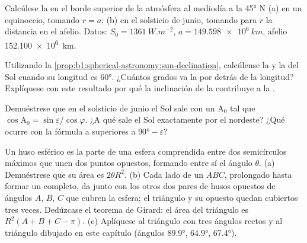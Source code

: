 \begin{exercise}[$\star\star$]\label{exo:b1:spherical-astronomy:9}
Calcúlese la  en el borde superior de la atmósfera al mediodía a la
 \ang{45} N (a) en un equinoccio, tomando $r = a$; (b) en el solsticio de
junio, tomando para $r$ la distancia en el afelio. Datos: $S_0 = \qty{1361}{W.m^{-2}}$,
$a = \qty{149.598e6}{km}$, afelio \qty{152.100e6}{km}.
\end{exercise}

\begin{exercise}[$\star\star\star$]\label{exo:b1:spherical-astronomy:10}
Utilizando la \cref{prop:b1:spherical-astronomy:sun-declination}, calcúlense la
 y la  del Sol cuando su longitud  es
\ang{60}. ¿Cuántos grados va la  por detrás de la longitud?
Explíquese con este resultado por qué la inclinación de la  contribuye
a la .
\end{exercise}

\begin{exercise}[$\star\star\star$]\label{exo:b1:spherical-astronomy:11}
Demuéstrese que en el solsticio de junio el Sol sale con un 
$\mathrm{A}_0$ tal que $\cos\mathrm{A}_0 = \sin\varepsilon/\cos\varphi$. ¿A qué
 sale el Sol exactamente por el nordeste? ¿Qué ocurre con la fórmula a
 superiores a $\ang{90} - \varepsilon$?
\end{exercise}

\begin{exercise}[$\star\star\star$]\label{exo:b1:spherical-astronomy:12}
Un huso esférico es la parte de una esfera comprendida entre dos semicírculos
máximos que unen dos puntos opuestos, formando entre sí el ángulo $\theta$.
(a) Demuéstrese que su área es $2\theta R^2$. (b) Cada lado de un  $ABC$, prolongado hasta formar un  completo, da junto con
los otros dos pares de husos opuestos de ángulos $A$, $B$, $C$ que cubren la
esfera; el triángulo y su opuesto quedan cubiertos tres veces. Dedúzcase el
teorema de Girard: el área del triángulo es $R^2(A + B + C - \pi)$. (c)
Aplíquese al triángulo con tres ángulos rectos y al triángulo dibujado en este
capítulo (ángulos \ang{89.9}, \ang{64.9}, \ang{67.4}).
\end{exercise}

